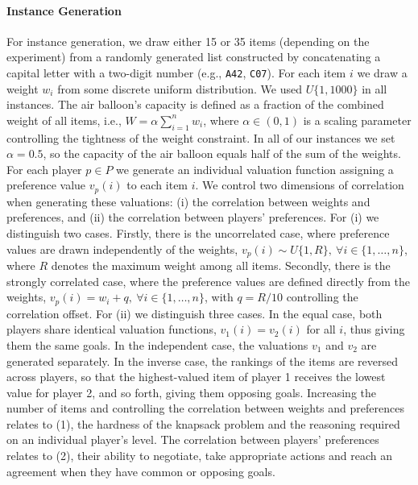 \paragraph{Instance Generation}
For instance generation, we draw either 15 or 35 items (depending on the experiment) from a randomly generated list constructed by concatenating a capital letter with a two-digit number (e.g., \texttt{A42}, \texttt{C07}). For each item $i$ we draw a weight $w_i$ from some discrete uniform distribution. We used $U\{1,1000\}$ in all instances. The air balloon's capacity is defined as a fraction of the combined weight of all items, i.e., $W = \alpha \sum_{i=1}^{n} w_i$, where $\alpha \in (0,1)$ is a scaling parameter controlling the tightness of the weight constraint. In all of our instances we set $\alpha = 0.5$, so the capacity of the air balloon equals half of the sum of the weights. For each player $p \in P$ we generate an individual valuation function assigning a preference value $v_p(i)$ to each item $i$. We control two dimensions of correlation when generating these valuations: (i) the correlation between weights and preferences, and (ii) the correlation between players’ preferences. 
For (i) we distinguish two cases. Firstly, there is the uncorrelated case, where preference values are drawn independently of the weights, $v_p(i) \sim U\{1,R\}, \ \forall i \in \{1,\dots,n\}$, where $R$ denotes the maximum weight among all items. Secondly, there is the strongly correlated case, where the preference values are defined directly from the weights, $v_p(i) = w_i + q, \ \forall i \in \{1,\dots,n\}$, with $q = R/10$ controlling the correlation offset. For (ii) we distinguish three cases. In the equal case, both players share identical valuation functions, $v_1(i) = v_2(i)$ for all $i$, thus giving them the same goals. In the independent case, the valuations $v_1$ and $v_2$ are generated separately. In the inverse case, the rankings of the items are reversed across players, so that the highest-valued item of player 1 receives the lowest value for player 2, and so forth, giving them opposing goals. 
Increasing the number of items and controlling the correlation between weights and preferences relates to (1), the hardness of the knapsack problem and the reasoning required on an individual player’s level. The correlation between players’ preferences relates to (2), their ability to negotiate, take appropriate actions and reach an agreement when they have common or opposing goals.
